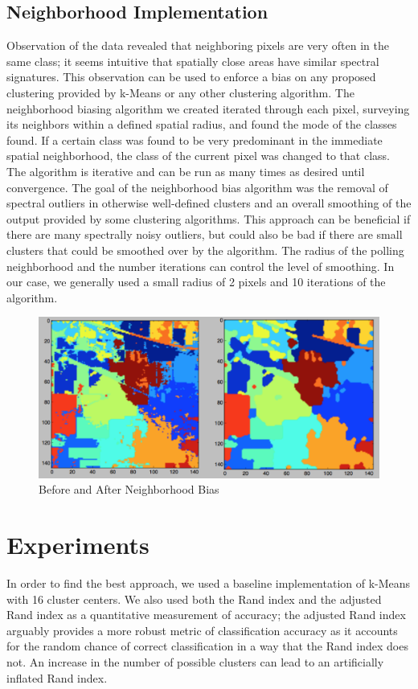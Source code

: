 \documentclass[journal]{IEEEtran}
\begin{document}
  \subsection{Neighborhood Implementation}
    Observation of the data revealed that neighboring pixels are very often in the same class; it seems intuitive that spatially close areas have similar spectral signatures.  This observation can be used to enforce a bias on any proposed clustering provided by k-Means or any other clustering algorithm. The neighborhood biasing algorithm we created iterated through each pixel, surveying its neighbors within a defined spatial radius, and found the mode of the classes found. If a certain class was found to be very predominant in the immediate spatial neighborhood, the class of the current pixel was changed to that class. The algorithm is iterative and can be run as many times as desired until convergence. The goal of the neighborhood bias algorithm was the removal of spectral outliers in otherwise well-defined clusters and an overall smoothing of the output provided by some clustering algorithms. This approach can be beneficial if there are many spectrally noisy outliers, but could also be bad if there are small clusters that could be smoothed over by the algorithm. The radius of the polling neighborhood and the number iterations can control the level of smoothing. In our case, we generally used a small radius of 2 pixels and 10 iterations of the algorithm.\\

    \begin{figure}[h!]
      \centering\includegraphics[width=\columnwidth]{images/BandUnB.png}
      \caption{Before and After Neighborhood Bias}
      \label{fig:NeighborhoodBias}
    \end{figure}

\section{Experiments}
  In order to find the best approach, we used a baseline implementation of k-Means with 16 cluster centers. We also used both the Rand index and the adjusted Rand index as a quantitative measurement of accuracy; the adjusted Rand index arguably provides a more robust metric of classification accuracy as it accounts for the random chance of correct classification in a way that the Rand index does not. An increase in the number of possible clusters can lead to an artificially inflated Rand index.\\
\end{document}

